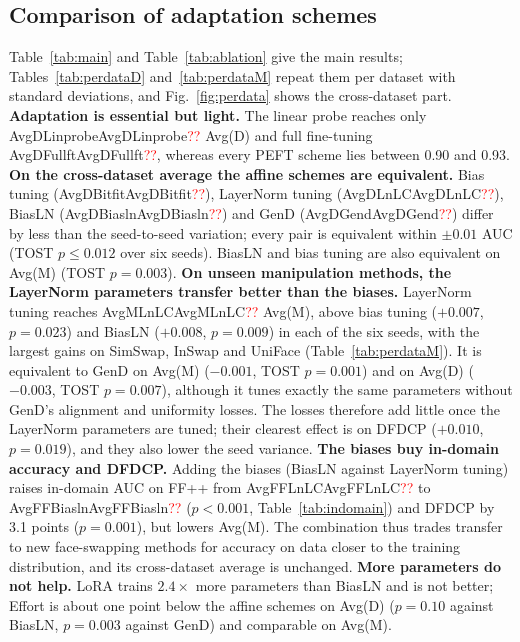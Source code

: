 \documentclass[fonts]{icst}
\newcommand{\num}[1]{\ifcsname #1\endcsname\csname #1\endcsname\else\textcolor{red}{??}\fi}
\begin{document}
\subsection{Comparison of adaptation schemes}
\label{sec:main}
Table~\ref{tab:main} and Table~\ref{tab:ablation} give the main results; Tables~\ref{tab:perdataD} and~\ref{tab:perdataM} repeat them per dataset with standard deviations, and Fig.~\ref{fig:perdata} shows the cross-dataset part.
\textbf{Adaptation is essential but light.} The linear probe reaches only \num{AvgDLinprobe} Avg(D) and full fine-tuning \num{AvgDFullft}, whereas every PEFT scheme lies between 0.90 and 0.93.
\textbf{On the cross-dataset average the affine schemes are equivalent.} Bias tuning (\num{AvgDBitfit}), LayerNorm tuning (\num{AvgDLnLC}), BiasLN (\num{AvgDBiasln}) and GenD (\num{AvgDGend}) differ by less than the seed-to-seed variation; every pair is equivalent within $\pm0.01$ AUC (TOST $p\le0.012$ over six seeds). BiasLN and bias tuning are also equivalent on Avg(M) (TOST $p=0.003$).
\textbf{On unseen manipulation methods, the LayerNorm parameters transfer better than the biases.} LayerNorm tuning reaches \num{AvgMLnLC} Avg(M), above bias tuning ($+0.007$, $p=0.023$) and BiasLN ($+0.008$, $p=0.009$) in each of the six seeds, with the largest gains on SimSwap, InSwap and UniFace (Table~\ref{tab:perdataM}). It is equivalent to GenD on Avg(M) ($-0.001$, TOST $p=0.001$) and on Avg(D) ($-0.003$, TOST $p=0.007$), although it tunes exactly the same parameters without GenD's alignment and uniformity losses. The losses therefore add little once the LayerNorm parameters are tuned; their clearest effect is on DFDCP ($+0.010$, $p=0.019$), and they also lower the seed variance.
\textbf{The biases buy in-domain accuracy and DFDCP.} Adding the biases (BiasLN against LayerNorm tuning) raises in-domain AUC on FF++ from \num{AvgFFLnLC} to \num{AvgFFBiasln} ($p<0.001$, Table~\ref{tab:indomain}) and DFDCP by 3.1 points ($p=0.001$), but lowers Avg(M). The combination thus trades transfer to new face-swapping methods for accuracy on data closer to the training distribution, and its cross-dataset average is unchanged.
\textbf{More parameters do not help.} LoRA trains $2.4\times$ more parameters than BiasLN and is not better; Effort is about one point below the affine schemes on Avg(D) ($p=0.10$ against BiasLN, $p=0.003$ against GenD) and comparable on Avg(M).

\begin{table}[!t]
\centering
\caption{Cross-dataset video AUC ($\times100$), mean $\pm$ std over $n$ seeds (same runs as Table~\ref{tab:main}). Bold: best; shaded: second best.}
\label{tab:perdataD}
\footnotesize

\vspace{3mm}
\caption{Cross-method video AUC ($\times100$) on the seven DF40 face-swapping sets, mean $\pm$ std over $n$ seeds. Bold: best; shaded: second best.}
\label{tab:perdataM}
\resizebox{\textwidth}{!}{}
\end{table}
\end{document}
